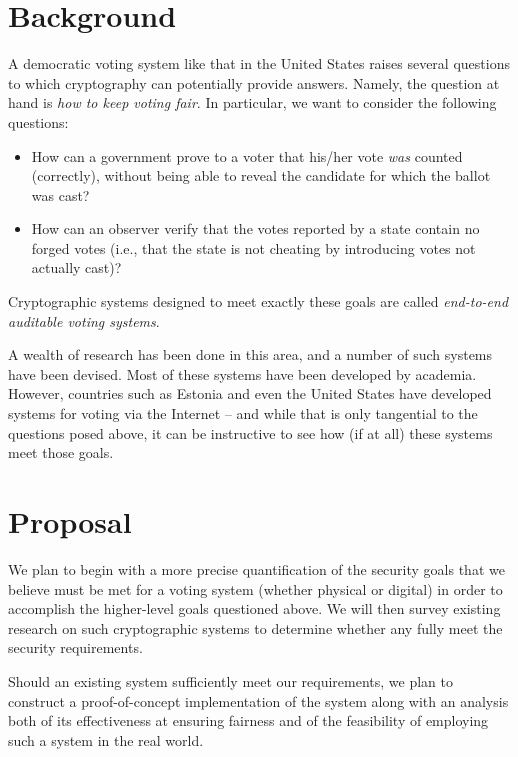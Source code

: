 \documentclass[10pt]{article}
\newcommand{\term}[1]{\textit{#1}}
\begin{document}
	\begin{multicols}{2}

		\section{Background}

			A democratic voting system like that in the United States raises several questions to which
			cryptography can potentially provide answers. Namely, the question at hand is \emph{how to keep
			voting fair}. In particular, we want to consider the following questions:
			\begin{itemize}

				\item
					How can a government prove to a voter that his/her vote \emph{was} counted (correctly),
					without being able to reveal the candidate for which the ballot was cast?

				\item
					How can an observer verify that the votes reported by a state contain no forged votes (i.e.,
					that the state is not cheating by introducing votes not actually cast)?

			\end{itemize}
			Cryptographic systems designed to meet exactly these goals are called \term{end-to-end auditable
			voting systems}\cite{end_to_end}.

			A wealth of research has been done in this area, and a number of such systems have been devised.
			Most of these systems have been developed by academia. However, countries such as Estonia and
			even the United States have developed systems for voting via the Internet
			\cite{estonia,us_vs_est} -- and while that is only tangential to the questions posed above, it
			can be instructive to see how (if at all) these systems meet those goals.

		\section{Proposal}

			We plan to begin with a more precise quantification of the security goals that we believe must
			be met for a voting system (whether physical or digital) in order to accomplish the higher-level
			goals questioned above. We will then survey existing research on such cryptographic systems to
			determine whether any fully meet the security requirements.

			Should an existing system sufficiently meet our requirements, we plan to construct a
			proof-of-concept implementation of the system along with an analysis both of its effectiveness
			at ensuring fairness and of the feasibility of employing such a system in the real world.


\end{multicols}
\end{document}

